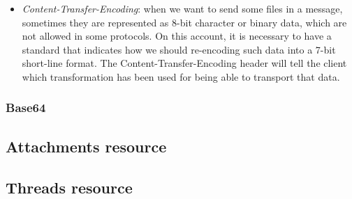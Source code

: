 \begin{itemize}
	\item\textit{Content-Transfer-Encoding}: when we want to send some files in a message, sometimes they are represented as 8-bit character or binary data, which are not allowed in some protocols. On this account, it is necessary to have a standard that indicates how we should re-encoding such data into a 7-bit short-line format. The Content-Transfer-Encoding header \citep{w3cte} will tell the client which transformation has been used for being able to transport that data.
\end{itemize}

\subsubsection{Base64} \label{sssect:base64} %

\subsection{Attachments resource} \label{ssect:attres}

\subsection{Threads resource}\label{ssect:threads}


